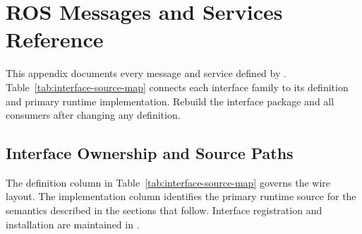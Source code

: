 \chapter{ROS Messages and Services Reference}
\label{app:interfaces}

This appendix documents every message and service defined by
. Table~\ref{tab:interface-source-map} connects each
interface family to its definition and primary runtime implementation. Rebuild
the interface package and all consumers after changing any definition.

\section{Interface Ownership and Source Paths}

The definition column in Table~\ref{tab:interface-source-map} governs the wire
layout. The implementation column identifies the primary runtime source for
the semantics described in the sections that follow. Interface registration
and installation are maintained in
.

